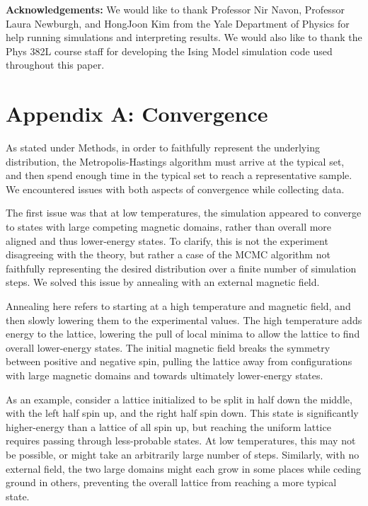\documentclass[letter,scriptaddress,twocolumn, prl,nofootinbib]{revtex4}
\begin{document}
\textbf{Acknowledgements:}
	We would like to thank Professor Nir Navon, Professor Laura Newburgh, and HongJoon Kim from the Yale Department of Physics for help running simulations and interpreting results. We would also like to thank the Phys 382L course staff for developing the Ising Model simulation code used throughout this paper.
	
 


\appendix
\section{Appendix A: Convergence}

As stated under Methods, in order to faithfully represent the underlying distribution, the Metropolis-Hastings algorithm must arrive at the typical set, and then spend enough time in the typical set to reach a representative sample. We encountered issues with both aspects of convergence while collecting data.

The first issue was that at low temperatures, the simulation appeared to converge to states with large competing magnetic domains, rather than overall more aligned and thus lower-energy states. To clarify, this is not the experiment disagreeing with the theory, but rather a case of the MCMC algorithm not faithfully representing the desired distribution over a finite number of simulation steps. We solved this issue by annealing with an external magnetic field.

Annealing here refers to starting at a high temperature and magnetic field, and then slowly lowering them to the experimental values. The high temperature adds energy to the lattice, lowering the pull of local minima to allow the lattice to find overall lower-energy states. The initial magnetic field breaks the symmetry between positive and negative spin, pulling the lattice away from configurations with large magnetic domains and towards ultimately lower-energy states. 

As an example, consider a lattice initialized to be split in half down the middle, with the left half spin up, and the right half spin down. This state is significantly higher-energy than a lattice of all spin up, but reaching the uniform lattice requires passing through less-probable states. At low temperatures, this may not be possible, or might take an arbitrarily large number of steps. Similarly, with no external field, the two large domains might each grow in some places while ceding ground in others, preventing the overall lattice from reaching a more typical state.
\end{document}
